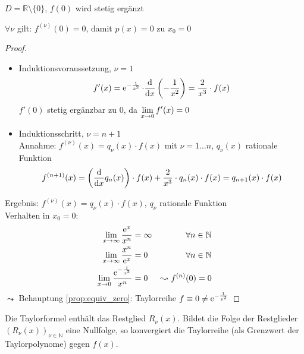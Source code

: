 \noindent $D=\mathbb{R}\setminus \{0\}$, $f(0)$ wird stetig ergänzt
\begin{proposition}\label{prop:equiv_zero}
  $\forall \nu$ gilt: $f^{(\nu)}(0) = 0$, damit $p(x) = 0 \text{ zu } x_0 = 0$
\end{proposition}

\begin{center}
\end{center}

\begin{proof}
  \begin{itemize}
    \item Induktionsvoraussetzung, $\nu = 1$
      \[ f'(x) = \operatorname{e}^{-\frac{1}{x^2}}\cdot \frac{\mathrm d}{\mathrm d x}\left(-\frac{1}{x^2}\right) = \frac{2}{x^3}\cdot f(x) \]
      $f'(0)$ stetig ergänzbar zu $0$, da $\displaystyle\lim_{x \rightarrow 0} f'(x) = 0$
    \item Induktionsschritt, $\nu = n + 1$\\
      Annahme: $f^{(\nu)}(x) = q_\nu(x)\cdot f(x)$ mit $\nu=1\ldots n$, $q_\nu(x)$ rationale Funktion
      \[
        f^{(n+1)}(x) = \left(\frac{\mathrm d}{\mathrm d x} q_n(x)\right)\cdot f(x) + \frac{2}{x^3} \cdot q_n(x) \cdot f(x)= q_{n+1}(x) \cdot f(x)
      \]
  \end{itemize}
  Ergebnis: $f^{(\nu)}(x) = q_\nu(x)\cdot f(x)$, $q_\nu$ rationale Funktion\\
  Verhalten in $x_0 = 0$:
  \begin{align*}
    \lim_{x\rightarrow \infty} \frac{\operatorname{e}^x}{x^n} & = \infty & \forall n \in \mathbb{N}\\
    \lim_{x\rightarrow \infty} \frac{x^n}{\operatorname{e}^x} & = 0 & \forall n \in \mathbb{N}\\
    \lim_{x\rightarrow 0} \frac{\operatorname{e}^{-\frac{1}{x^2}}}{x^n} & = 0 & \leadsto f^{(n)}(0) = 0
  \end{align*}
  $\leadsto$ Behauptung \ref{prop:equiv_zero}: Taylorreihe $f \equiv 0 \neq \operatorname{e}^{-\frac{1}{x^2}}$
\end{proof}

\noindent Die Taylorformel enthält das Restglied $R_\nu(x)$. Bildet die Folge der Restglieder $(R_\nu(x))_{\nu \in \mathbb{N}}$ eine Nullfolge, so konvergiert die Taylorreihe (als Grenzwert der Taylorpolynome) gegen $f(x)$.

